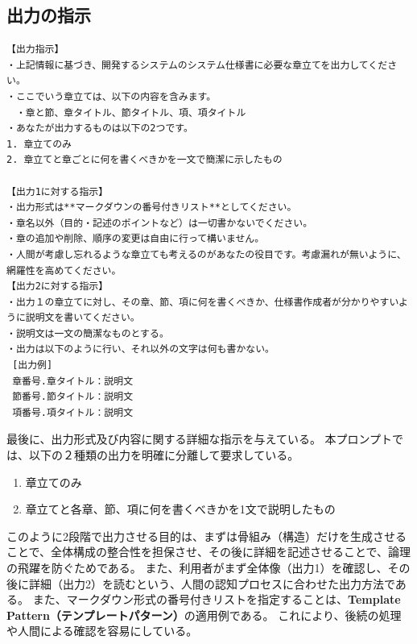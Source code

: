 \subsection{出力の指示}

\begin{tcolorbox}[
  colback=white,
  colframe=black,
  fonttitle=\bfseries,
  breakable
]
\footnotesize
\ttfamily
\fontsize{11}{12}\selectfont
\begin{verbatim}
【出力指示】
・上記情報に基づき、開発するシステムのシステム仕様書に必要な章立てを出力してください。
・ここでいう章立ては、以下の内容を含みます。
　・章と節、章タイトル、節タイトル、項、項タイトル
・あなたが出力するものは以下の2つです。
1. 章立てのみ
2. 章立てと章ごとに何を書くべきかを一文で簡潔に示したもの

【出力1に対する指示】 
・出力形式は**マークダウンの番号付きリスト**としてください。 
・章名以外（目的・記述のポイントなど）は一切書かないでください。 
・章の追加や削除、順序の変更は自由に行って構いません。
・人間が考慮し忘れるような章立ても考えるのがあなたの役目です。考慮漏れが無いように、網羅性を高めてください。
【出力2に対する指示】
・出力１の章立てに対し、その章、節、項に何を書くべきか、仕様書作成者が分かりやすいように説明文を書いてください。
・説明文は一文の簡潔なものとする。
・出力は以下のように行い、それ以外の文字は何も書かない。
 [出力例]
 章番号.章タイトル：説明文
 節番号.節タイトル：説明文
 項番号.項タイトル：説明文
\end{verbatim}
\end{tcolorbox}
\par\vspace{-20pt}
\label{fig:output_instruction}



最後に、出力形式及び内容に関する詳細な指示を与えている。
本プロンプトでは、以下の２種類の出力を明確に分離して要求している。
\begin{enumerate}
  \item 章立てのみ
  \item 章立てと各章、節、項に何を書くべきかを1文で説明したもの
\end{enumerate}
このように2段階で出力させる目的は、まずは骨組み（構造）だけを生成させることで、全体構成の整合性を担保させ、その後に詳細を記述させることで、論理の飛躍を防ぐためである。
また、利用者がまず全体像（出力1）を確認し、その後に詳細（出力2）を読むという、人間の認知プロセスに合わせた出力方法である。
また、マークダウン形式の番号付きリストを指定することは、\textbf{Template Pattern（テンプレートパターン）}の適用例である。
これにより、後続の処理や人間による確認を容易にしている。

